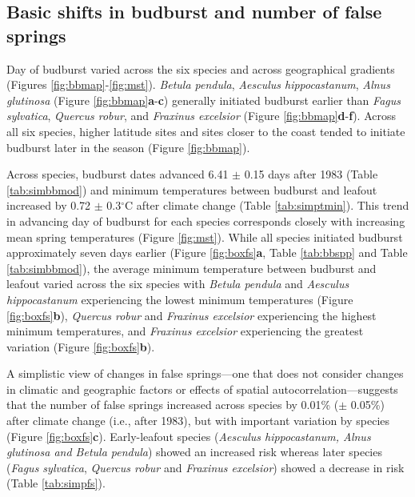 \documentclass{article}\usepackage[]{graphicx}\usepackage[]{color}
\begin{document}
\subsection*{Basic shifts in budburst and number of false springs}
Day of budburst varied across the six species and across geographical gradients (Figures \ref{fig:bbmap}-\ref{fig:mst}). \textit{Betula pendula}, \textit{Aesculus hippocastanum}, \textit{Alnus glutinosa} (Figure \ref{fig:bbmap}\textbf{a}-\textbf{c}) generally initiated budburst earlier than \textit{Fagus sylvatica}, \textit{Quercus robur}, and \textit{Fraxinus excelsior} (Figure \ref{fig:bbmap}\textbf{d}-\textbf{f}). Across all six species, higher latitude sites and sites closer to the coast tended to initiate budburst later in the season (Figure \ref{fig:bbmap}).  

Across species, budburst dates advanced 6.41 $\pm$ 0.15 days after 1983 (Table \ref{tab:simbbmod}) and minimum temperatures between budburst and leafout increased by 0.72 $\pm$ 0.3$^{\circ}$C after climate change (Table \ref{tab:simptmin}). This trend in advancing day of budburst for each species corresponds closely with increasing mean spring temperatures (Figure \ref{fig:mst}). While all species initiated budburst approximately seven days earlier (Figure \ref{fig:boxfs}\textbf{a}, Table \ref{tab:bbspp} and Table \ref{tab:simbbmod}), the average minimum temperature between budburst and leafout varied across the six species with \textit{Betula pendula} and \textit{Aesculus hippocastanum} experiencing the lowest minimum temperatures (Figure \ref{fig:boxfs}\textbf{b}), \textit{Quercus robur} and \textit{Fraxinus excelsior} experiencing the highest minimum temperatures, and \textit{Fraxinus excelsior} experiencing the greatest variation (Figure \ref{fig:boxfs}\textbf{b}). 

A simplistic view of changes in false springs---one that does not consider changes in climatic and geographic factors or effects of spatial autocorrelation---suggests that the number of false springs increased across species by 0.01\% ($\pm$ 0.05\%) after climate change (i.e., after 1983), but with important variation by species (Figure \ref{fig:boxfs}\textbf{c}). Early-leafout species (\textit{Aesculus hippocastanum, \textit{Alnus glutinosa} and \textit{Betula pendula}}) showed an increased risk whereas later species (\textit{Fagus sylvatica}, \textit{Quercus robur} and \textit{Fraxinus excelsior}) showed a decrease in risk (Table \ref{tab:simpfs}). 
\end{document}
